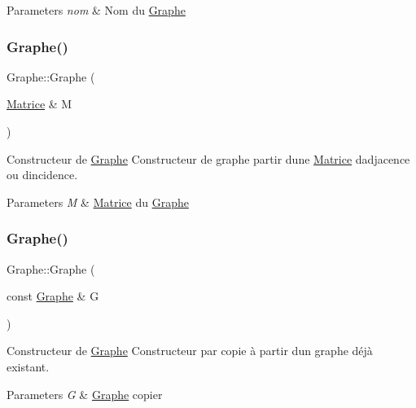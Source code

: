 \begin{DoxyParams}{Parameters}
{\em nom} & Nom du \hyperlink{classGraphe}{Graphe} \\
\hline
\end{DoxyParams}
\mbox{\label{classGraphe_a8d0d20eb7e5d2f4edb5a95d5dbfd1c87}} 
\subsubsection{\texorpdfstring{Graphe()}{Graphe()}\hspace{0.1cm}{\footnotesize\ttfamily [3/5]}}
{\footnotesize\ttfamily Graphe\+::\+Graphe (\begin{DoxyParamCaption}\item[{\hyperlink{classMatrice}{Matrice} \&}]{M }\end{DoxyParamCaption})}



Constructeur de \hyperlink{classGraphe}{Graphe} Constructeur de graphe  partir d\textquotesingle{}une \hyperlink{classMatrice}{Matrice} d\textquotesingle{}adjacence ou d\textquotesingle{}incidence. 


\begin{DoxyParams}{Parameters}
{\em M} & \hyperlink{classMatrice}{Matrice} du \hyperlink{classGraphe}{Graphe} \\
\hline
\end{DoxyParams}
\mbox{\label{classGraphe_a997c9551ac4c6416d2ea587c1a4f1206}} 
\subsubsection{\texorpdfstring{Graphe()}{Graphe()}\hspace{0.1cm}{\footnotesize\ttfamily [4/5]}}
{\footnotesize\ttfamily Graphe\+::\+Graphe (\begin{DoxyParamCaption}\item[{const \hyperlink{classGraphe}{Graphe} \&}]{G }\end{DoxyParamCaption})}



Constructeur de \hyperlink{classGraphe}{Graphe} Constructeur par copie \`{a} partir d\textquotesingle{}un graphe d\'{e}j\`{a} existant. 


\begin{DoxyParams}{Parameters}
{\em G} & \hyperlink{classGraphe}{Graphe}  copier \\
\hline
\end{DoxyParams}
\mbox{\label{classGraphe_afae3a2bc32d94c1a830bca8e0b8753b0}} 
